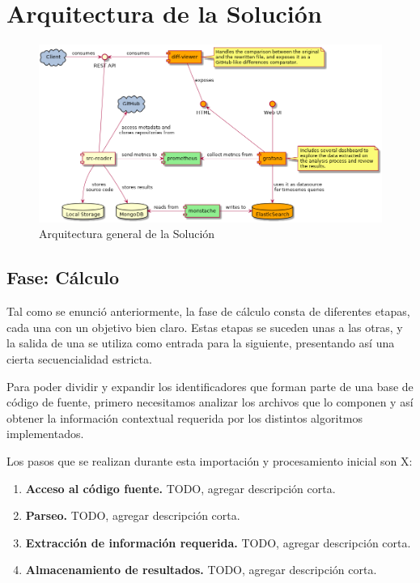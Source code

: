 \section{Arquitectura de la Solución}

\begin{figure}[H]
    \includegraphics[width=12cm]{implementation/architecture_overview.png}
    \centering
    \caption{Arquitectura general de la Solución}
  \end{figure}


\subsection{Fase: Cálculo}

Tal como se enunció anteriormente, la fase de cálculo consta de diferentes etapas, cada una con un objetivo
bien claro.
Estas etapas se suceden unas a las otras, y la salida de una se utiliza como entrada para la siguiente,
presentando así una cierta secuencialidad estricta.

Para poder dividir y expandir los identificadores que forman parte de una base de código de fuente, 
primero necesitamos analizar los archivos que lo componen y así obtener la información contextual requerida 
por los distintos algoritmos implementados.

Los pasos que se realizan durante esta importación y procesamiento inicial son X:
\begin{enumerate}
  \item \textbf{Acceso al código fuente.} TODO, agregar descripción corta.
  \item \textbf{Parseo.} TODO, agregar descripción corta.
  \item \textbf{Extracción de información requerida.} TODO, agregar descripción corta.
  \item \textbf{Almacenamiento de resultados.} TODO, agregar descripción corta.
\end{enumerate}

